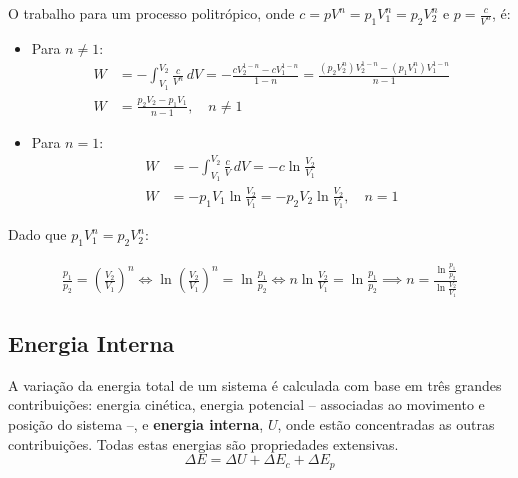 O trabalho para um processo politrópico, onde $c = p V^n = p_1 V_1^n = p_2 V_2^n$ e $p = \frac{c}{V^n}$, é:

\begin{itemize}
    \item Para $n \neq 1$:
    \begin{equation*}
        \begin{split}
            W & = - \int_{V_1}^{V_2} \frac{c}{V^n} \, dV  = - \frac{c V_2^{1-n} - c V_1^{1-n}}{1-n} = \frac{(p_2 V_2^n) V_2^{1-n} - (p_1 V_1^n) V_1^{1-n}}{n - 1} \\
            W & = \frac{p_2 V_2 - p_1 V_1}{n - 1}, \quad n \neq 1
        \end{split}
    \end{equation*}
    \item Para $n = 1$:
    \begin{equation*}
        \begin{split}
            W & = - \int_{V_1}^{V_2} \frac{c}{V} \, dV  = - c \ln \frac{V_2}{V_1} \\
            W & = - p_1 V_1 \ln \frac{V_2}{V_1} = - p_2 V_2 \ln \frac{V_2}{V_1}, \quad n = 1
        \end{split}
    \end{equation*} 
\end{itemize}

Dado que $p_1V_1^n = p_2V_2^n$:

\begin{eqnarray}
    \frac{p_1}{p_2} = \left( \frac{V_2}{V_1} \right)^n \Longleftrightarrow 
    \ln \left( \frac{V_2}{V_1} \right)^n = \ln \frac{p_1}{p_2} \Longleftrightarrow 
    n \ln \frac{V_2}{V_1} = \ln \frac{p_1}{p_2} \implies
    n = \frac{\ln \frac{p_1}{p_2}}{\ln \frac{V_2}{V_1}}
\end{eqnarray}

\subsection{Energia Interna}

A variação da energia total de um sistema é calculada com base em três grandes contribuições: energia cinética, energia potencial -- associadas ao movimento e posição do sistema --, e \textbf{energia interna}, $U$, onde estão concentradas as outras contribuições. Todas estas energias são propriedades extensivas.
\begin{equation}
    \Delta E = \Delta U + \Delta E_c + \Delta E_p 
\end{equation}

